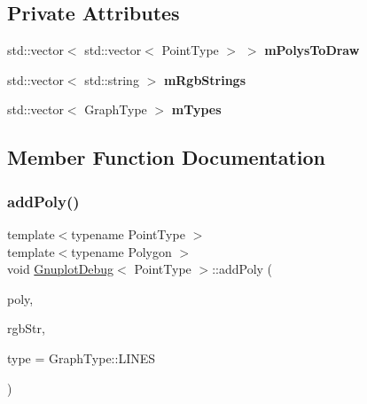 \subsection*{Private Attributes}
\begin{DoxyCompactItemize}
\item 
\mbox{\label{class_gnuplot_debug_ac61e5ea9d59fe22cc032ed8205a8d9b7}} 
std\+::vector$<$ std\+::vector$<$ Point\+Type $>$ $>$ {\bfseries m\+Polys\+To\+Draw}
\item 
\mbox{\label{class_gnuplot_debug_af29afad0bc0edc62400b851e371ff22c}} 
std\+::vector$<$ std\+::string $>$ {\bfseries m\+Rgb\+Strings}
\item 
\mbox{\label{class_gnuplot_debug_a07521d13a95439ffa57c4e8872f6debb}} 
std\+::vector$<$ Graph\+Type $>$ {\bfseries m\+Types}
\end{DoxyCompactItemize}


\subsection{Member Function Documentation}
\mbox{\label{class_gnuplot_debug_a6a7c67bbc05029c50f9a8d80db0e17c0}} 
\subsubsection{\texorpdfstring{addPoly()}{addPoly()}}
{\footnotesize\ttfamily template$<$typename Point\+Type $>$ \\
template$<$typename Polygon $>$ \\
void \mbox{\hyperlink{class_gnuplot_debug}{Gnuplot\+Debug}}$<$ Point\+Type $>$\+::add\+Poly (\begin{DoxyParamCaption}\item[{const Polygon \&}]{poly,  }\item[{const std\+::string \&}]{rgb\+Str,  }\item[{Graph\+Type}]{type = {\ttfamily GraphType\+:\+:LINES} }\end{DoxyParamCaption})\hspace{0.3cm}{\ttfamily [inline]}}



